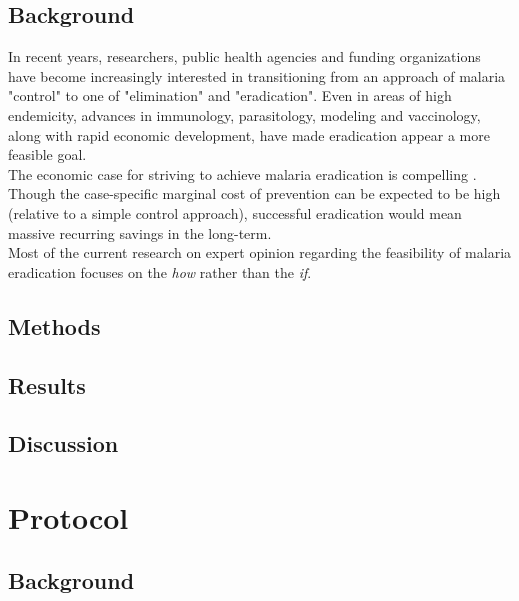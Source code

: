\documentclass{article}
\begin{document}
\subsection*{Background}

In recent years, researchers, public health agencies and funding organizations have become increasingly interested in transitioning from an approach of malaria "control" to one of "elimination" and "eradication".\cite{Tanner2015} Even in areas of high endemicity, advances in immunology, parasitology, modeling and vaccinology, along with rapid economic development, have made eradication appear a more feasible goal. \cite{Snow2015, Eckhoff2014}  \\

\noindent The economic case for striving to achieve malaria eradication is compelling \cite{Barofsky2015}. Though the case-specific marginal cost of prevention can be expected to be high (relative to a simple control approach), successful eradication would mean massive recurring savings in the long-term. \\

\noindent Most of the current research on expert opinion regarding the feasibility of malaria eradication focuses on the \emph{how} rather than the \emph{if}.\cite{Tanner2015} 

\subsection*{Methods}

\subsection*{Results}

\subsection*{Discussion}


\newpage
\section*{Protocol}


\subsection*{Background}
\end{document}

